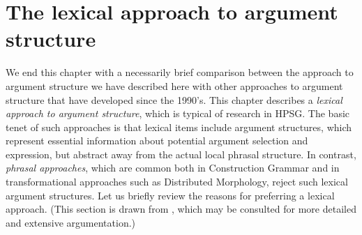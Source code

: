 \documentclass[output=paper
                ,modfonts
                ,nonflat
	        ,collection
	        ,collectionchapter
	        ,collectiontoclongg
 	        ,biblatex
                ,babelshorthands
                ,newtxmath
                ,draftmode
                ,colorlinks, citecolor=brown
]{./langsci/langscibook}
\begin{document}

\section{The lexical approach to argument structure}
\label{lexicalapproach}

We end this chapter with a necessarily brief comparison between the approach to argument structure we have described here with other approaches to argument structure that have developed since the 1990's.
This chapter describes a \textit{lexical approach to argument structure}, which is typical of research in HPSG.  The basic tenet of such approaches is that lexical items include argument structures, which represent essential information about potential argument selection and expression, but
abstract away from the actual local phrasal structure.  In contrast, \emph{phrasal approaches}, which
are common both in Construction Grammar  and in transformational approaches such as Distributed Morphology, reject such lexical argument structures.   Let us briefly review the reasons for preferring a lexical approach. (This section is drawn from \citet{MWArgSt}, which may be consulted for more detailed and extensive argumentation.) 
\end{document}
